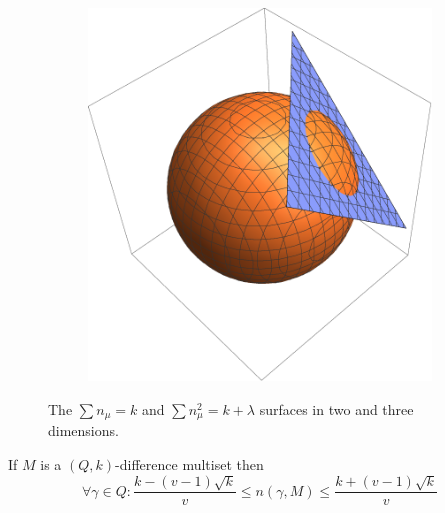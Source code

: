 \begin{figure}
\begin{subfigure}[b]{0.5\textwidth}
            \includegraphics[width=\textwidth]{assets/surfacesIn3D}
        \end{subfigure}
        \caption{The $\sum {n_\mu} = k$ and $\sum n_\mu^2 = k + \lambda$ surfaces in two and three dimensions.}
        \label{general:figure:surfaces}
    \end{figure}
        
    \begin{theorem}
        \label{general:theorem:limits}
        If $M$ is a $(Q,k)$-difference multiset then
        \begin{equation}
            \forall \gamma \in Q \colon \frac{k-(v-1)\sqrt k}{v} \leq n(\gamma,M) \leq \frac{k+(v-1)\sqrt k}{v}
        \end{equation}
    \end{theorem}
    
